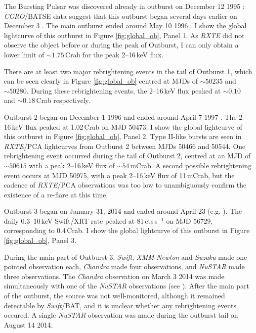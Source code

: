 \par The Bursting Pulsar was discovered already in outburst on December 12 1995 \citep{Fishman_Discovery}; \textit{CGRO}/BATSE data suggest that this outburst began several days earlier on December 3 \citep{Paciesas_BPDiscovery,Bildsten_Rev}.  The main outburst ended around May 10 1996 \citep{Woods_PulseBursts}.  I show the global lightcurve of this outburst in Figure \ref{fig:global_ob}, Panel 1.  As \indexrxte\textit{RXTE} did not observe the object before or during the peak of Outburst, I can only obtain a lower limit of $\sim1.75$\,Crab for the peak 2--16\,keV flux.
\par There are at least two major rebrightening events in the tail of Outburst 1, which can be seen clearly  in Figure \ref{fig:global_ob} centred at MJDs of $\sim50235$ and $\sim50280$.  During these rebrightening events, the 2--16\,keV flux peaked at $\sim0.10$ and $\sim0.18$\,Crab respectively.

\par Outburst 2 began on December 1 1996 and ended around April 7 1997 \citep{Woods_OB2}.  The 2--16\,keV flux peaked at 1.02\,Crab on MJD 50473; I show the global lightcurve of this outburst in Figure \ref{fig:global_ob}, Panel 2.  Type II-like bursts are seen in \indexpca\textit{RXTE}/PCA lightcurves from Outburst 2 between MJDs 50466 and 50544.  One rebrightening event occurred during the tail of Outburst 2, centred at an MJD of $\sim50615$ with a peak 2--16\,keV flux of $\sim54$\,mCrab.  A second possible rebrightening event occurs at MJD 50975, with a peak 2--16\,keV flux of 11\,mCrab, but the cadence of \textit{RXTE}/PCA observations was too low to unambiguously confirm the existence of a re-flare at this time.

\par Outburst 3 began on January 31, 2014 \citep{Negoro_OB3,Kennea_BPOutburst} and ended around April 23 (e.g. \citealp{Dai_OB3}).  The daily 0.3--10\,keV Swift/XRT rate peaked at 81\,cts\,s$^{-1}$ on MJD 56729, corresponding to 0.4\,Crab.  I show the global lightcurve of this outburst in Figure \ref{fig:global_ob}, Panel 3.
\par During the main part of Outburst 3, \indexswift\textit{Swift}, \indexxmm\textit{XMM-Newton} and \indexsuzaku\textit{Suzaku} made one pointed observation each, \indexchandra\textit{Chandra} made four observations, and \indexnustar\textit{NuSTAR} made three observations.  The \textit{Chandra} observation on March 3 2014 was made simultaneously with one of the \textit{NuSTAR} observations (see \citealp{Younes_Expo}).  After the main part of the outburst, the source was not well-monitored, although it remained detectable by \indexbat\textit{Swift}/BAT, and it is unclear whether any rebrightening events occured.  A single \textit{NuSTAR} observation was made during the outburst tail on August 14 2014.

